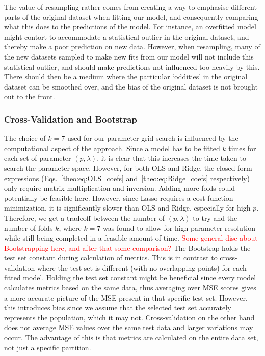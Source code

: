 \documentclass[twocolumn,english,notitlepage]{article}
\newcommand{\comment}[1]{\textcolor{red}{#1}}
\begin{document}
        The value of resampling rather comes from creating a way to emphasise different parts of the original dataset when fitting our model, and consequently comparing what this does to the predictions of the model. For instance, an overfitted model might contort to accommodate a statistical outlier in the original dataset, and thereby make a poor prediction on new data. However, when resampling, many of the new datasets sampled to make new fits from our model will not include this statistical outlier, and should make predictions not influenced too heavily by this. There should then be a medium where the particular `oddities' in the original dataset can be smoothed over, and the bias of the original dataset is not brought out to the front.

        \subsubsection{Cross-Validation and Bootstrap} 
            The choice of $k=7$ used for our parameter grid search is influenced by the computational aspect of the approach. Since a model has to be fitted $k$ times for each set of parameter $(p,\lambda)$, it is clear that this increases the time taken to search the parameter space. However, for both OLS and Ridge, the closed form expressions (Eqs.~\eqref{theo:eq:OLS_coefs} and~\eqref{theo:eq:Ridge_coefs} respectively) only require matrix multiplication and inversion. Adding more folds could potentially be feasible here. However, since Lasso requires a cost function minimization, it is significantly slower than OLS and Ridge, especially for high $p$. Therefore, we get a tradeoff between the number of $(p,\lambda)$ to try and the number of folds $k$, where $k=7$ was found to allow for high parameter resolution while still being completed in a feasible amount of time.
            \newline
            \comment{Some general disc about Bootstrapping here, and after that some comparison?}
            \newline
            The Bootstrap holds the test set constant during calculation of metrics. This is in contrast to cross-validation where the test set is different (with no overlapping points) for each fitted model. Holding the test set constant might be beneficial since every model calculates metrics based on the same data, thus averaging over MSE scores gives a more accurate picture of the MSE present in that specific test set. However, this introduces bias since we assume that the selected test set accurately represents the population, which it may not. Cross-validation on the other hand does not average MSE values over the same test data and larger variations may occur. The advantage of this is that metrics are calculated on the entire data set, not just a specific partition.
\end{document}
